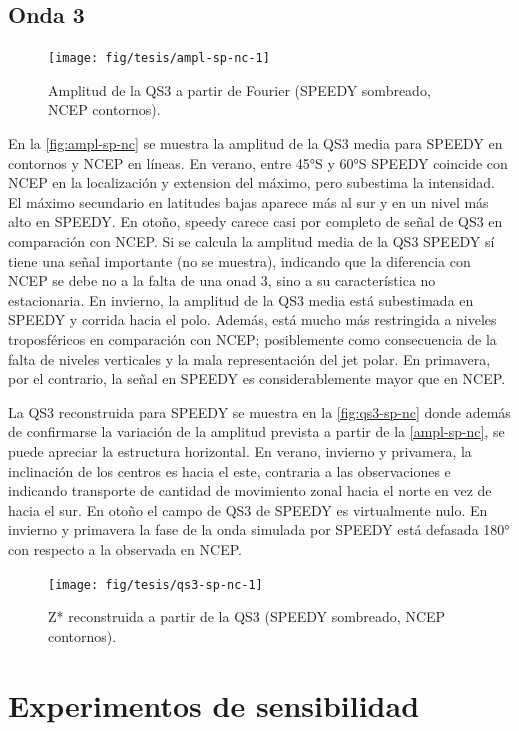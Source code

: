 \documentclass[spanish,a4paper,12pt,oneside]{book}
\begin{document}
\subsection{Onda 3}\label{onda-3-1}

\begin{figure}
\texttt{[image: fig/tesis/ampl-sp-nc-1]} \caption{Amplitud de la QS3 a partir de Fourier (SPEEDY sombreado, NCEP contornos).}\label{fig:ampl-sp-nc}
\end{figure}

En la \autoref{fig:ampl-sp-nc} se muestra la amplitud de la QS3 media
para SPEEDY en contornos y NCEP en líneas. En verano, entre 45°S y 60°S
SPEEDY coincide con NCEP en la localización y extension del máximo, pero
subestima la intensidad. El máximo secundario en latitudes bajas aparece
más al sur y en un nivel más alto en SPEEDY. En otoño, speedy carece
casi por completo de señal de QS3 en comparación con NCEP. Si se calcula
la amplitud media de la QS3 SPEEDY sí tiene una señal importante (no se
muestra), indicando que la diferencia con NCEP se debe no a la falta de
una onad 3, sino a su característica no estacionaria. En invierno, la
amplitud de la QS3 media está subestimada en SPEEDY y corrida hacia el
polo. Además, está mucho más restringida a niveles troposféricos en
comparación con NCEP; posiblemente como consecuencia de la falta de
niveles verticales y la mala representación del jet polar. En primavera,
por el contrario, la señal en SPEEDY es considerablemente mayor que en
NCEP.

La QS3 reconstruida para SPEEDY se muestra en la \autoref{fig:qs3-sp-nc}
donde además de confirmarse la variación de la amplitud prevista a
partir de la \autoref{ampl-sp-nc}, se puede apreciar la estructura
horizontal. En verano, invierno y privamera, la inclinación de los
centros es hacia el este, contraria a las observaciones e indicando
transporte de cantidad de movimiento zonal hacia el norte en vez de
hacia el sur. En otoño el campo de QS3 de SPEEDY es virtualmente nulo.
En invierno y primavera la fase de la onda simulada por SPEEDY está
defasada 180° con respecto a la observada en NCEP.

\begin{figure}
\texttt{[image: fig/tesis/qs3-sp-nc-1]} \caption{Z* reconstruida a partir de la QS3 (SPEEDY sombreado, NCEP contornos).}\label{fig:qs3-sp-nc}
\end{figure}

\section{Experimentos de
sensibilidad}\label{experimentos-de-sensibilidad}
\end{document}
